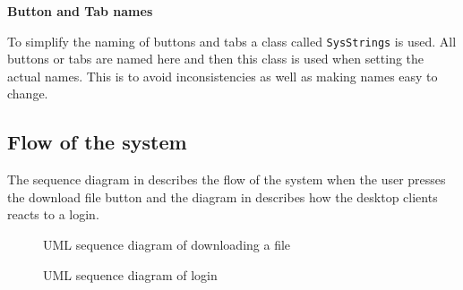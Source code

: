 \textbf{Button and Tab names}

To simplify the naming of buttons and tabs a class called \texttt{SysStrings} is used. All buttons or tabs are named here and then this class is used when setting the actual names. This is to avoid inconsistencies as well as making names easy to change.

\subsection{Flow of the system}

The sequence diagram in  describes the flow of the system when the user presses the download file button and the diagram in  describes how the desktop clients reacts to a login.

\begin{figure}[htb!]
	\caption{\footnotesize UML sequence diagram of downloading a file}
	\label{fig:des_download-sequence}
\end{figure}

\begin{figure}[htb!]
	\caption{\footnotesize UML sequence diagram of login}
	\label{fig:des_login-sequence}
\end{figure}
\FloatBarrier
